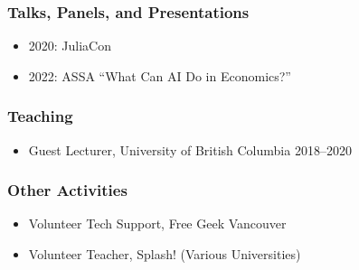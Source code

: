 \documentclass[12pt]{article}   %
\begin{document}
\subsubsection*{Talks, Panels, and Presentations}
\begin{itemize}
  \item 2020: JuliaCon 
  \item 2022: ASSA ``What Can AI Do in Economics?''
\end{itemize}


\subsubsection*{Teaching}
\begin{itemize}
  \item Guest Lecturer, University of British Columbia \hfill 2018--2020
\end{itemize}

\subsubsection*{Other Activities}
\begin{itemize}
  \item Volunteer Tech Support, Free Geek Vancouver 
  
  \item Volunteer Teacher, Splash! (Various Universities)
\end{itemize}
\end{document}
